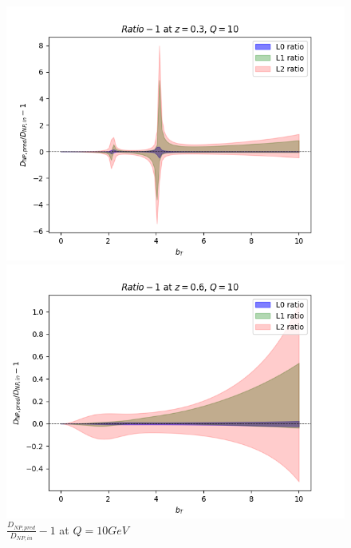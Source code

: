 \documentclass{article}
\begin{document}
\begin{itemize}
    \begin{figure}[H]
    \centering
    \begin{minipage}{0.45\textwidth}
        \centering
        \includegraphics[width=\textwidth]{Images/unc_levels/RealVsPredRatio_D_NP_Q_10_z_0.3.png}
        \caption{$z = 0.3$}
    \end{minipage}\hfill
    \begin{minipage}{0.45\textwidth}
        \centering
        \includegraphics[width=\textwidth]{Images/unc_levels/RealVsPredRatio_D_NP_Q_10_z_0.6.png}
        \caption{$z=0.6$}
    \end{minipage}
    \caption{$\frac{D_{NP, pred}}{D_{NP, in}}-1$ at $Q=10 GeV$}
    \end{figure}


\end{itemize}
\end{document}
